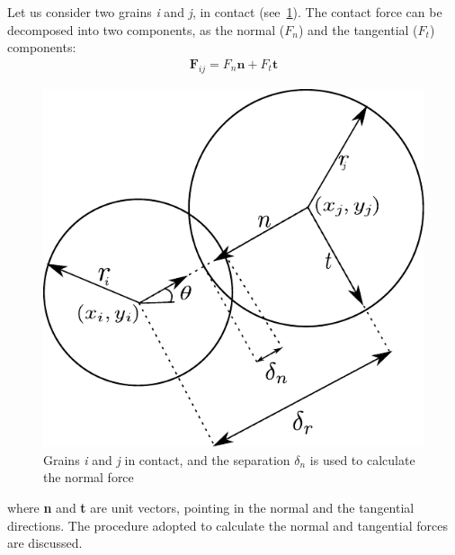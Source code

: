 Let us consider two grains \textit{i} and \textit{j}, in contact 
(see~\cref{fig:DEM}). The 
contact force can be decomposed into two components, as the normal 
($\mathit{F}_{n}$) and the 
tangential ($\mathit{F}_{t}$) components:
\begin{align}
 \mathbf{F}_{ij}=F_{n}\mathbf{n}+F_{t}\mathbf{t}
\label{eq:fnt}
\end{align}

\begin{figure}[htbp]
	\centering
	\includegraphics{DEM}
	\caption[Calculation of normal force]{Grains \textit{i} and \textit{j} in 
	contact, and the 
	separation $\delta_{n}$ is used to calculate the normal force} 
	\label{fig:DEM}
\end{figure}
where \textbf{n} and \textbf{t} are unit vectors, pointing in the normal and 
the tangential 
directions. The procedure adopted to calculate the normal and tangential forces 
are discussed.

